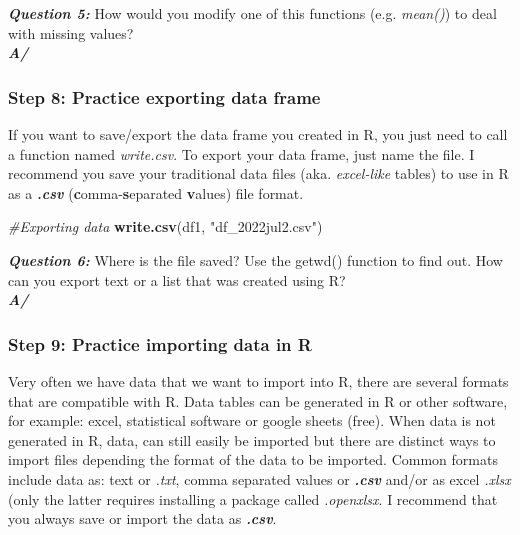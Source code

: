 \documentclass[]{article}
\newenvironment{Shaded}{\begin{snugshade}}{\end{snugshade}}
\newcommand{\CommentTok}[1]{\textcolor[rgb]{0.56,0.35,0.01}{\textit{#1}}}
\newcommand{\KeywordTok}[1]{\textcolor[rgb]{0.13,0.29,0.53}{\textbf{#1}}}
\newcommand{\NormalTok}[1]{#1}
\newcommand{\StringTok}[1]{\textcolor[rgb]{0.31,0.60,0.02}{#1}}
\begin{document}
\textbf{\emph{Question 5:}} How would you modify one of this functions
(e.g. \emph{mean()}) to deal with missing values?\\
\textbf{\emph{A/}}

\hypertarget{step-8-practice-exporting-data-frame}{%
\subsubsection{Step 8: Practice exporting data
frame}\label{step-8-practice-exporting-data-frame}}

If you want to save/export the data frame you created in R, you just
need to call a function named \emph{write.csv}. To export your data
frame, just name the file. I recommend you save your traditional data
files (aka. \emph{excel-like} tables) to use in R as a
\textbf{\emph{.csv}} (\textbf{c}omma-\textbf{s}eparated \textbf{v}alues)
file format.

\begin{Shaded}
\begin{Highlighting}[]
\CommentTok{#Exporting data}
\KeywordTok{write.csv}\NormalTok{(df1, }\StringTok{"df_2022jul2.csv"}\NormalTok{) }
\end{Highlighting}
\end{Shaded}

\textbf{\emph{Question 6:}} Where is the file saved? Use the getwd()
function to find out. How can you export text or a list that was created
using R?\\
\textbf{\emph{A/}}

\hypertarget{step-9-practice-importing-data-in-r}{%
\subsubsection{Step 9: Practice importing data in
R}\label{step-9-practice-importing-data-in-r}}

Very often we have data that we want to import into R, there are several
formats that are compatible with R. Data tables can be generated in R or
other software, for example: excel, statistical software or google
sheets (free). When data is not generated in R, data, can still easily
be imported but there are distinct ways to import files depending the
format of the data to be imported. Common formats include data as: text
or \emph{.txt}, comma separated values or \textbf{\emph{.csv}} and/or as
excel \emph{.xlsx} (only the latter requires installing a package called
\emph{.openxlsx}. I recommend that you always save or import the data as
\textbf{\emph{.csv}}.
\end{document}
